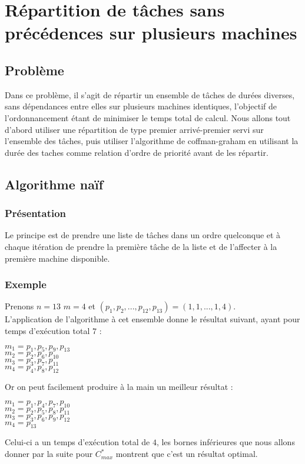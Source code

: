 \section{Répartition de tâches sans précédences sur plusieurs machines}
\subsection{Problème}
Dans ce problème, il s'agit de répartir un ensemble de tâches de durées 
diverses, sans dépendances entre elles sur plusieurs machines identiques, 
l'objectif de l'ordonnancement étant de minimiser le temps total de calcul.
Nous allons tout d'abord utiliser une répartition de type premier arrivé-premier 
servi sur l'ensemble des tâches, puis utiliser l'algorithme de coffman-graham en 
utilisant la durée des taches comme relation d'ordre de priorité avant de les 
répartir.

\subsection{Algorithme naïf}
\subsubsection{Présentation}
Le principe est de prendre une liste de tâches dans un ordre quelconque et 
à chaque itération de prendre la première tâche de la liste et de l'affecter 
à la première machine disponible.
\subsubsection{Exemple}
Prenons ${n=13}$ ${m=4}$ et ${(p_{1},p_{2},...,p_{12},p_{13}) 
= (1,1,...,1,4)}$.\\
L'application de l'algorithme à cet ensemble donne le résultat suivant, ayant 
pour temps d'exécution total $7$ :
\begin{center}
$m_{1} = {p_{1},p_{5},p_{9},p_{13}}$ \\
$m_{2} = {p_{2},p_{6},p_{10}}$ \\
$m_{3} = {p_{3},p_{7},p_{11}}$ \\
$m_{4} = {p_{4},p_{8},p_{12}}$ \\
\end{center}
Or on peut facilement produire à la main un meilleur résultat :
\begin{center}
$m_{1} = {p_{1},p_{4},p_{7},p_{10}}$ \\
$m_{2} = {p_{2},p_{5},p_{8},p_{11}}$ \\
$m_{3} = {p_{3},p_{6},p_{9},p_{12}}$ \\
$m_{4} = {p_{13}}$ \\
\end{center}
Celui-ci a un temps d'exécution total de $4$, les bornes inférieures que nous 
allons donner par la suite pour $C^*_{max}$ montrent que c'est un résultat 
optimal.
